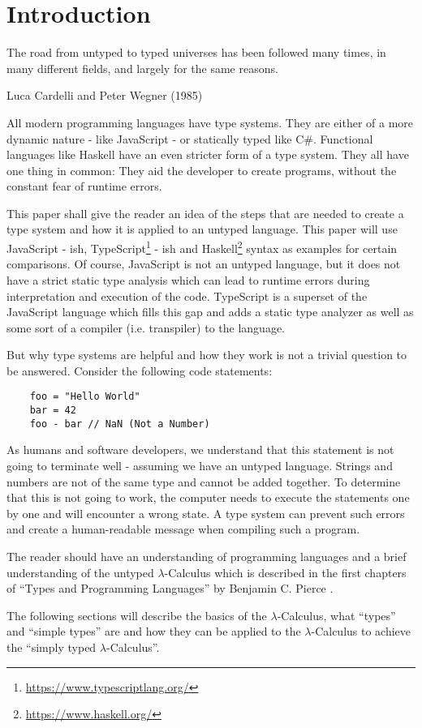 \section{Introduction}

\epigraph{
    The road from untyped to typed universes has been followed many times,
    in many different fields, and largely for the same reasons.
}
{Luca Cardelli and Peter Wegner (1985)}

All modern programming languages have type systems.
They are either of a more dynamic nature - like JavaScript -
or statically typed like C\#. Functional languages like Haskell have
an even stricter form of a type system. They all have one thing in
common: They aid the developer to create programs, without the
constant fear of runtime errors.

This paper shall give the reader an idea of the steps that
are needed to create a type system and how it is applied to
an untyped language. This paper will use JavaScript - ish,
TypeScript\footnote{\url{https://www.typescriptlang.org/}} - ish
and Haskell\footnote{\url{https://www.haskell.org/}}
syntax as examples for certain comparisons.
Of course, JavaScript is not an untyped language, but
it does not have a strict static type analysis which can lead
to runtime errors during interpretation and execution of the code.
TypeScript is a superset of the JavaScript language which fills this
gap and adds a static type analyzer as well as some sort of a compiler
(i.e. transpiler) to the language.

But why type systems are helpful and how they work
is not a trivial question to be answered. Consider
the following code statements:

\begin{verbatim}
    foo = "Hello World"
    bar = 42
    foo - bar // NaN (Not a Number)
\end{verbatim}

As humans and software developers, we understand that this statement
is not going to terminate well - assuming we have an untyped
language. Strings and numbers are not
of the same type and cannot be added together. To determine
that this is not going to work, the computer needs to execute
the statements one by one and will encounter a wrong state.
A type system can prevent such errors and create a
human-readable message when compiling such a program.

The reader should have an understanding of programming
languages and a brief understanding of the untyped
$\lambda$-Calculus which is described in the first
chapters of ``Types and Programming Languages'' by
Benjamin C. Pierce \cite{pierce2002ProgLang}.

The following sections will describe the basics of the
$\lambda$-Calculus, what ``types'' and ``simple types'' are
and how they can be applied to the $\lambda$-Calculus to
achieve the ``simply typed $\lambda$-Calculus''.

